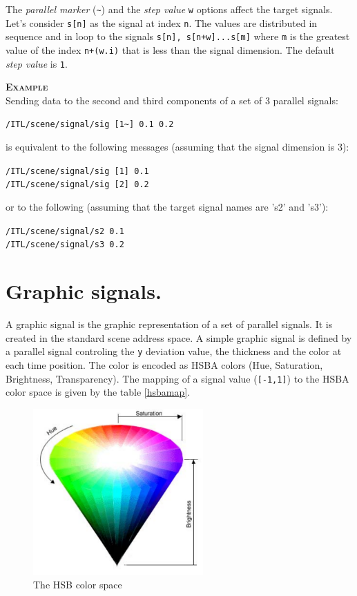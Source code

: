 \documentclass[a4paper,twoside]{report}
\newcommand{\sublevel}[1]	{\section{#1}}
\newcommand{\OSC}[1]		{\texttt{#1}}
\newcommand{\values}[1]	{\texttt{#1}}
\newcommand{\example}		{\textbf{\hspace{-1.5cm}\textbf{\textsc{Example }}}}
\newcommand{\sample}	[1]			{\vspace{-2mm}\begin{center}\colorbox{mygrey}{
								\begin{minipage}[t]{0.9\columnwidth} 
								{\small \texttt{#1}}
								\end{minipage}}\end{center}}
\newcommand{\sampleindent}	{ \hspace{0.5cm} }
\begin{document}
The \emph{parallel marker} (\OSC{\~{}}) and the \emph{step value} \values{w} options affect the target signals. Let's consider \values{s[n]} as the signal at index \values{n}. The values are distributed in sequence and in loop to the signals \values{s[n], s[n+w]...s[m]} where \values{m} is the greatest value of the index \values{n+(w.i)} that is less than the signal dimension. The default  \emph{step value} is \values{1}.

\example \\
Sending data to the second and third components of a set of 3 parallel signals:
\sample{/ITL/scene/signal/sig [1\~{}] 0.1 0.2}
\sampleindent is equivalent to the following messages (assuming that the signal dimension is 3):
\sample{/ITL/scene/signal/sig [1] 0.1\\
/ITL/scene/signal/sig [2] 0.2
}
\sampleindent or to the following (assuming that the target signal names are 's2' and 's3'):
\sample{/ITL/scene/signal/s2 0.1\\
/ITL/scene/signal/s3 0.2
}


\sublevel{Graphic signals.}
\label{gsignal}

A graphic signal is the graphic representation of a set of parallel signals. It is created in the standard scene address space. A simple graphic signal is defined by a parallel signal controling the \values{y} deviation value, the thickness and the color at each time position. The color is encoded as HSBA colors (Hue, Saturation, Brightness, Transparency). The mapping of a signal value  (\values{[-1,1]}) to the HSBA color space is given by the table \ref{hsbamap}. 

\begin{figure}[h]
	\centering \includegraphics[width=65mm]{imgs/hsb}
 \caption{The HSB color space}
 \label{hsbfiug}
\end{figure}
\end{document}
